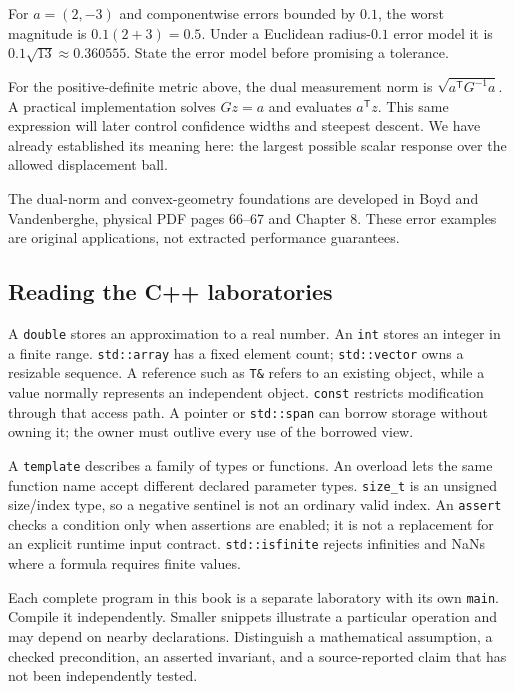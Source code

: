 For \(a=(2,-3)\) and componentwise errors bounded by \(0.1\), the worst magnitude is \(0.1(2+3)=0.5\). Under a Euclidean radius-\(0.1\) error model it is \(0.1\sqrt{13}\approx0.360555\). State the error model before promising a tolerance.

For the positive-definite metric above, the dual measurement norm is \(\sqrt{a^{\mathsf T}G^{-1}a}\). A practical implementation solves \(Gz=a\) and evaluates \(a^{\mathsf T}z\). This same expression will later control confidence widths and steepest descent. We have already established its meaning here: the largest possible scalar response over the allowed displacement ball.

The dual-norm and convex-geometry foundations are developed in Boyd and Vandenberghe, physical PDF pages 66--67 and Chapter 8. These error examples are original applications, not extracted performance guarantees.

\subsection{Reading the C++ laboratories}\label{reading-the-c-laboratories}

A \texttt{double} stores an approximation to a real number. An \texttt{int} stores an integer in a finite range. \texttt{std::array} has a fixed element count; \texttt{std::vector} owns a resizable sequence. A reference such as \texttt{T\&} refers to an existing object, while a value normally represents an independent object. \texttt{const} restricts modification through that access path. A pointer or \texttt{std::span} can borrow storage without owning it; the owner must outlive every use of the borrowed view.

A \texttt{template} describes a family of types or functions. An overload lets the same function name accept different declared parameter types. \texttt{size\_t} is an unsigned size/index type, so a negative sentinel is not an ordinary valid index. An \texttt{assert} checks a condition only when assertions are enabled; it is not a replacement for an explicit runtime input contract. \texttt{std::isfinite} rejects infinities and NaNs where a formula requires finite values.

Each complete program in this book is a separate laboratory with its own \texttt{main}. Compile it independently. Smaller snippets illustrate a particular operation and may depend on nearby declarations. Distinguish a mathematical assumption, a checked precondition, an asserted invariant, and a source-reported claim that has not been independently tested.

